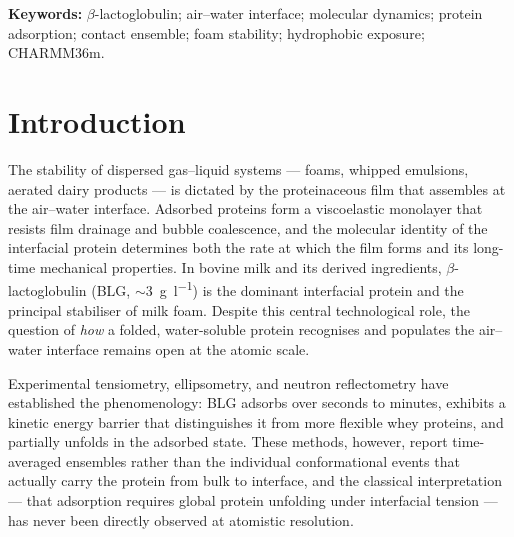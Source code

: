 \documentclass[11pt,a4paper]{article}
\begin{document}
\begin{abstract}
sustained interfacial contact arises without calyx activation. The
protein remains globally compact throughout ($R_\mathrm{g} =
\SI{1.496 \pm 0.009}{\nano\metre}$ in R1; $\beta$-barrel backbone
RMSD \SIrange{0.20}{0.24}{\nano\metre} across all three near-interface
replicas), with loop CD/EF the dominant flexible region near the
interface rather than the global unfolding traditionally invoked to
explain interfacial activity.
These results establish what \SI{4.00}{\micro\second} of unbiased
atomistic MD resolves: the pre-commitment contact ensemble, with its
SASA and orientation distributions, and where the simulation boundary
lies --- gate-open and commitment steps are not sampled on this
timescale, and enhanced sampling is required to characterise the
activation barrier.
\end{abstract}

\vspace{6pt}

\noindent\textbf{Keywords:} $\beta$-lactoglobulin; air--water interface;
molecular dynamics; protein adsorption; contact ensemble; foam stability;
hydrophobic exposure; CHARMM36m.

\section{Introduction}

The stability of dispersed gas--liquid systems --- foams, whipped emulsions,
aerated dairy products --- is dictated by the proteinaceous film that
assembles at the air--water interface. Adsorbed proteins form a viscoelastic
monolayer that resists film drainage and bubble coalescence, and the molecular
identity of the interfacial protein determines both the rate at which the film
forms and its long-time mechanical
properties\citep{Dickinson1999,BertonCarabin2018,Damodaran2005,Narsimhan2018}. In bovine
milk and its derived ingredients, $\beta$-lactoglobulin (BLG, $\sim$\SI{3}{\gram\per\litre})
is the dominant interfacial protein and the principal stabiliser of milk
foam\citep{Cornec1999,Barbiroli2022,Huppertz2010}. Despite this central technological role,
the question of \emph{how} a folded, water-soluble protein recognises and
populates the air--water interface remains open at the atomic scale.

Experimental tensiometry, ellipsometry, and neutron reflectometry have
established the phenomenology: BLG adsorbs over seconds to minutes, exhibits
a kinetic energy barrier that distinguishes it from more flexible whey
proteins, and partially unfolds in the adsorbed
state\citep{Cornec1999,Mackie1999,Ulaganathan2017a,Foam4_2020,Perriman2007}. These methods, however,
report time-averaged ensembles rather than the individual conformational
events that actually carry the protein from bulk to interface, and the
classical interpretation --- that adsorption requires global protein
unfolding under interfacial tension\citep{Graham1979} --- has never been
directly observed at atomistic resolution.
\end{document}
